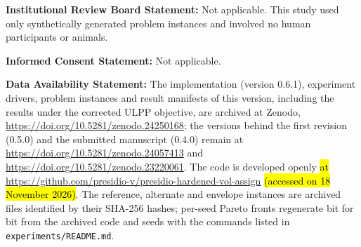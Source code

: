 \documentclass[systems,article,accept,moreauthors,pdftex]{Definitions/mdpi}
\providecommand{\dataavailability}[1]{\vspace{6pt}\noindent\textbf{Data Availability Statement:} #1\par}
\providecommand{\institutionalreview}[1]{\vspace{6pt}\noindent\textbf{Institutional Review Board Statement:} #1\par}
\providecommand{\informedconsent}[1]{\vspace{6pt}\noindent\textbf{Informed Consent Statement:} #1\par}
\begin{document}


\institutionalreview{Not applicable. This study used only synthetically generated problem instances and involved no human participants or animals.}

\informedconsent{Not applicable.}

\dataavailability{The implementation (version 0.6.1), experiment drivers, problem instances and result manifests of this version, including the results under the corrected ULPP objective, are archived at Zenodo, \url{https://doi.org/10.5281/zenodo.24250168}; the versions behind the first revision (0.5.0) and the submitted manuscript (0.4.0) remain at \url{https://doi.org/10.5281/zenodo.24057413} and \url{https://doi.org/10.5281/zenodo.23220061}. The code is developed openly \hl{at} %
 \url{https://github.com/presidio-v/presidio-hardened-vol-assign} \hl{(accessed on 18 November 2026)}. The reference, alternate and envelope instances are archived files identified by their SHA-256 hashes; per-seed Pareto fronts regenerate bit for bit from the archived code and seeds with the commands listed in \texttt{experiments/README.md}.}
\newpage
{}


\appendixstart
\appendix
\end{document}
